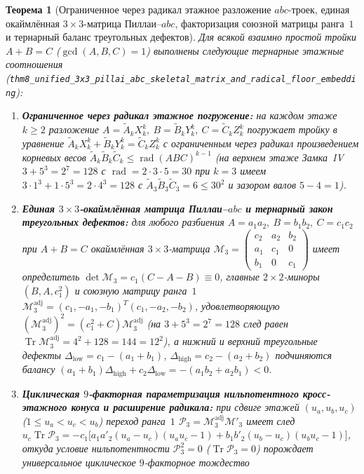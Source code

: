 \documentclass[11pt,a4paper]{article}
\theoremstyle{plain}
\newtheorem{theorem}{Теорема}[section]
\theoremstyle{definition}
\begin{document}
\begin{theorem}[Ограниченное через радикал этажное разложение $abc$-троек, единая окаймлённая $3\times 3$-матрица Пиллаи--$abc$, факторизация союзной матрицы ранга~$1$ и тернарный баланс треугольных дефектов]
\label{thm:main-8}
Для всякой взаимно простой тройки $A + B = C$ ($\gcd(A,B,C)=1$) выполнены следующие тернарные этажные соотношения (\texttt{thm8\_unified\_3x3\_pillai\_abc\_skeletal\_matrix\_and\_radical\_floor\_embedding}):
\begin{enumerate}[label=\textbf{(\roman*)},leftmargin=*]
\item \textbf{Ограниченное через радикал этажное погружение:}
  на каждом этаже $k\ge 2$ разложение $A = \widetilde{A}_k X_k^k,\ B = \widetilde{B}_k Y_k^k,\ C = \widetilde{C}_k Z_k^k$ погружает тройку в уравнение $\widetilde{A}_k X_k^k + \widetilde{B}_k Y_k^k = \widetilde{C}_k Z_k^k$ с ограниченным через радикал произведением корневых весов $\widetilde{A}_k\widetilde{B}_k\widetilde{C}_k \le \operatorname{rad}(ABC)^{k-1}$ (на верхнем этаже Замка~IV $3 + 5^3 = 2^7 = 128$ с $\operatorname{rad}=2\cdot 3\cdot 5=30$ при $k=3$ имеем $3\cdot 1^3 + 1\cdot 5^3 = 2\cdot 4^3 = 128$ с $\widetilde{A}_3\widetilde{B}_3\widetilde{C}_3 = 6 \le 30^2$ и зазором валов $5 - 4 = 1$).
\item \textbf{Единая $3\times 3$-окаймлённая матрица Пиллаи--$abc$ и тернарный закон треугольных дефектов:}
  для любого разбиения $A = a_1 a_2,\ B = b_1 b_2,\ C = c_1 c_2$ при $A + B = C$ окаймлённая $3\times 3$-матрица $\mathcal{M}_3 = \begin{pmatrix} c_2 & a_2 & b_2 \\ a_1 & c_1 & 0 \\ b_1 & 0 & c_1 \end{pmatrix}$ имеет определитель $\det\mathcal{M}_3 = c_1(C-A-B) \equiv 0$, главные $2\times 2$-миноры $(B, A, c_1^2)$ и союзную матрицу ранга~$1$ $\mathcal{M}_3^{\mathrm{adj}} = (c_1,-a_1,-b_1)^T(c_1,-a_2,-b_2)$, удовлетворяющую $(\mathcal{M}_3^{\mathrm{adj}})^2 = (c_1^2+C)\mathcal{M}_3^{\mathrm{adj}}$ (на $3 + 5^3 = 2^7 = 128$ след равен $\operatorname{Tr}\mathcal{M}_3^{\mathrm{adj}} = 4^2 + 128 = 144 = 12^2$), а нижний и верхний треугольные дефекты $\Delta_{\mathrm{low}} = c_1 - (a_1+b_1)$, $\Delta_{\mathrm{high}} = c_2 - (a_2+b_2)$ подчиняются балансу $(a_1+b_1)\Delta_{\mathrm{high}} + c_2\Delta_{\mathrm{low}} = -(a_1 b_2 + a_2 b_1) < 0$.
\item \textbf{Циклическая $9$-факторная параметризация нильпотентного кросс-этажного конуса и расширение радикала:}
  при сдвиге этажей $(u_a, u_b, u_c)$ ($1\le u_a < u_c < u_b$) переход ранга~$1$ $\mathcal{P}_3 = \mathcal{M}_3^{\mathrm{adj}}\mathcal{M}'_3$ имеет след $u_c\operatorname{Tr}\mathcal{P}_3 = -c_1\bigl[a_1 a'_2(u_a-u_c)(u_a u_c-1) + b_1 b'_2(u_b-u_c)(u_b u_c-1)\bigr]$, откуда условие нильпотентности $\mathcal{P}_3^2 = 0$ ($\operatorname{Tr}\mathcal{P}_3 = 0$) порождает универсальное циклическое $9$-факторное тождество

\end{enumerate}
\end{theorem}
\end{document}
